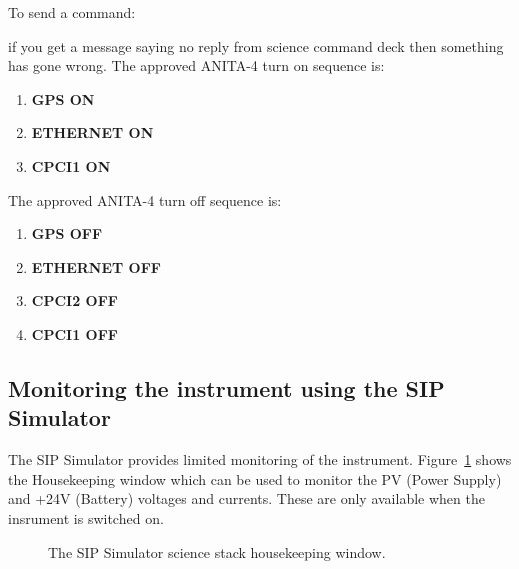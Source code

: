 \documentclass{article}
\begin{document}
  To send a command:
  if you get a message saying no reply from science command deck then something has gone wrong.
\newpage
  The approved ANITA-4 turn on sequence is:
  \begin{enumerate}
  \item \textbf{GPS ON}
  \item \textbf{ETHERNET ON}
  \item \textbf{CPCI1 ON}    
  \end{enumerate}

  The approved ANITA-4 turn off sequence is:
  \begin{enumerate}
  \item \textbf{GPS OFF}
  \item \textbf{ETHERNET OFF}
  \item \textbf{CPCI2 OFF}
  \item \textbf{CPCI1 OFF}    
  \end{enumerate}
    
  \subsection{Monitoring the instrument using the SIP Simulator}
  The SIP Simulator provides limited monitoring of the instrument. Figure~\ref{fig:hkWindow} shows the Housekeeping window which can be used to monitor the PV (Power Supply) and +24V (Battery) voltages and currents. These are only available when the insrument is switched on.
  
  \begin{figure}[hbt]
    \centering
    \caption{The SIP Simulator science stack housekeeping window.}
    \label{fig:hkWindow}    
  \end{figure}
\end{document}
